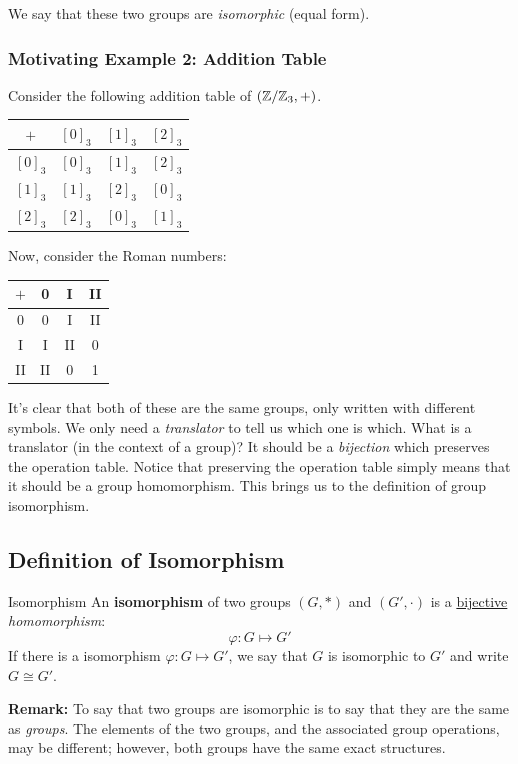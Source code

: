 \documentclass[letterpaper]{article}
\begin{document}
\bigskip 

We say that these two groups are \emph{isomorphic} (equal form). 

\subsubsection{Motivating Example 2: Addition Table}
Consider the following addition table of $(\mathbb{Z} / \mathbb{Z}_3, +)$.
\begin{center}
    \begin{tabular}{c|c c c}
        $+$     & $[0]_3$ & $[1]_3$ & $[2]_3$ \\ 
        \hline 
        $[0]_3$ & $[0]_3$ & $[1]_3$ & $[2]_3$ \\
        $[1]_3$ & $[1]_3$ & $[2]_3$ & $[0]_3$ \\
        $[2]_3$ & $[2]_3$ & $[0]_3$ & $[1]_3$ 
    \end{tabular}
\end{center}
Now, consider the Roman numbers: 
\begin{center}
    \begin{tabular}{c|c c c}
        $+$     & 0 & I & II \\ 
        \hline 
        0       & 0 & I & II \\ 
        I       & I & II & 0 \\ 
        II      & II & 0 & 1
    \end{tabular}
\end{center}
It's clear that both of these are the same groups, only written with different symbols. We only need a \emph{translator} to tell us which one is which. What is a translator (in the context of a group)? It should be a \emph{bijection} which preserves the operation table. Notice that preserving the operation table simply means that it should be a group homomorphism. This brings us to the definition of group isomorphism. 


\subsection{Definition of Isomorphism}
\begin{definition}{Isomorphism}{}
    An \textbf{isomorphism} of two groups $(G, *)$ and $(G', \cdot)$ is a \underline{bijective} \emph{homomorphism}: 
    \[\varphi: G \mapsto G'\]
    If there is a isomorphism $\varphi: G \mapsto G'$, we say that $G$ is isomorphic to $G'$ and write $G \cong G'$. 
\end{definition}
\textbf{Remark:} To say that two groups are isomorphic is to say that they are the same as \emph{groups}. The elements of the two groups, and the associated group operations, may be different; however, both groups have the same exact structures.
\end{document}
